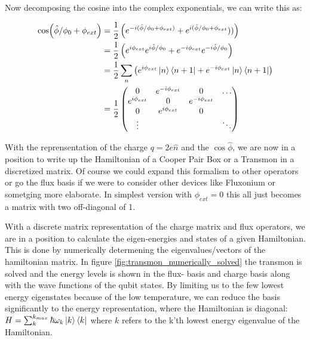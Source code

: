 Now decomposing the cosine into the complex exponentials, we can write this as:
\begin{fullwidth}
\begin{align}
    \cos(\hat{\phi}/\phi_0 + \phi_{ext}) &= \frac12 \left(e^{-i(\hat{\phi}/\phi_0 + \phi_{ext})} + e^{i(\hat{\phi}/\phi_0 + \phi_{ext}}))\right) \\
    &= \frac12 \left(e^{i\phi_{ext}}e^{i\hat{\phi}/\phi_0} + e^{-i\phi_{ext}}e^{-i\hat{\phi}/\phi_0}\right)  \\
    &= \frac12 \sum_n \left(e^{i\phi_{ext}} \ket{n}\bra{n + 1} + e^{-i\phi_{ext}} \ket{n}\bra{n+ 1}   \right) \\
    &= \frac12 \begin{pmatrix}
        0 & e^{-i\phi_{ext}} & 0 & \hdots \\
        e^{i\phi_{ext}} & 0 & e^{-i\phi_{ext}} \\
        0 & e^{i\phi_{ext}} & 0 & \\
        \vdots & & & \ddots 
    \end{pmatrix}
\end{align}
\end{fullwidth}
With the reprensentation of the charge $q = 2e\hat{n}$ and the $\cos{\hat{\phi}}$, we are now in a position to write up the Hamiltonian of a Cooper Pair Box or a Transmon in a discretized matrix. Of course we could expand this formalism to other operators or go the flux basis if we were to consider other devices like Fluxonium or sometging more elaborate.
In simplest version with $\phi_{ext} = 0$ this all just becomes a matrix with two off-diagonal of 1. 


With a discrete matrix representation of the charge matrix and flux operators, we are in a position to calculate the eigen-energies and states of a given Hamiltonian. This is done by numerically determening the eigenvalues/vectors of the hamiltonian matrix. In figure \ref{fig:transmon_numerically_solved} the transmon is solved and the energy levels is shown in the flux- basis and charge basis along with the wave functions of the qubit states. By limiting us to the few lowest energy eigenstates because of the low temperature, we can reduce the basis significantly to the energy representation, where the Hamiltonian is diagonal: $H = \sum_k^{k_{max}} \hbar \omega_k \ket{k}\bra{k}$ where $k$ refers to the k'th lowest energy eigenvalue of the Hamiltonian.

